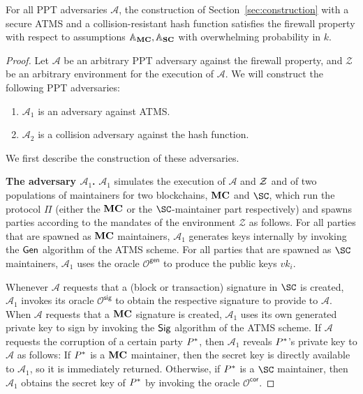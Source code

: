 \begin{lemma}[Firewall]\label{lem:firewall}
  For all PPT adversaries $\mathcal{A}$, the construction of
  Section~\ref{sec:construction} with a secure ATMS and a collision-resistant
  hash function satisfies the firewall property with respect to assumptions
  $\mathbb{A}_{\mathbf{MC}}, \mathbb{A}_{\mathbf{SC}}$ with overwhelming probability in $k$.
\end{lemma}
\begin{proof}
  Let $\mathcal{A}$ be an arbitrary PPT adversary against the firewall property,
  and $\mathcal{Z}$ be
  an arbitrary environment for the execution of $\mathcal{A}$.
  We will construct the following PPT adversaries:
  \begin{enumerate}
    \item $\mathcal{A}_1$ is an adversary against ATMS.
    \item $\mathcal{A}_2$ is a collision adversary against the hash function.
  \end{enumerate}
  We first describe the construction of these adversaries.

  \bigskip
  \textbf{The adversary $\mathcal{A}_1$.}
  $\mathcal{A}_1$ simulates the execution of $\mathcal{A}$ and $\mathcal{Z}$ and
  of two populations of maintainers for two blockchains, $\mathbf{MC}$ and $\SC$,
  which run the protocol $\Pi$ (either the $\mathbf{MC}$ or the $\SC$-maintainer part
  respectively) and spawns parties according to the mandates of the environment
  $\mathcal{Z}$ as follows. For all parties that are spawned as $\mathbf{MC}$
  maintainers, $\mathcal{A}_1$ generates keys internally by invoking the $\mathsf{Gen}$
  algorithm of the ATMS scheme. For all parties that are spawned as $\SC$
  maintainers, $\mathcal{A}_1$ uses the oracle $\mathcal{O}^\textsf{gen}$
  to produce the public keys $vk_i$.

  Whenever $\mathcal{A}$ requests that a (block or transaction) signature in
  $\SC$  is created, $\mathcal{A}_1$ invokes its oracle
  $\mathcal{O}^\textsf{sig}$ to obtain the respective signature to provide to
  $\mathcal{A}$. When $\mathcal{A}$ requests that a $\mathbf{MC}$ signature is created,
  $\mathcal{A}_1$ uses its own generated private key to sign by invoking the
  $\mathsf{Sig}$ algorithm of the ATMS scheme. If $\mathcal{A}$ requests the corruption
  of a certain party $P^*$, then $\mathcal{A}_1$ reveals $P^*$'s
  private key to $\mathcal{A}$ as follows: If $P^*$ is a $\mathbf{MC}$ maintainer,
  then the secret key is directly available to $\mathcal{A}_1$, so it is
  immediately returned. Otherwise, if $P^*$ is a $\SC$ maintainer, then
  $\mathcal{A}_1$ obtains the secret key of $P^*$ by invoking the oracle
  $\mathcal{O}^\textsf{cor}$.


\end{proof}
